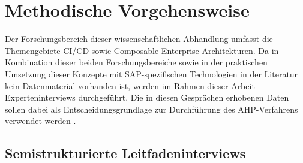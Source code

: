 \section{Methodische Vorgehensweise}

Der Forschungsbereich dieser wissenschaftlichen Abhandlung umfasst die Themengebiete CI/CD sowie Composable-Enterprise-Architekturen. Da in Kombination dieser beiden Forschungsbereiche sowie in der praktischen Umsetzung dieser Konzepte mit SAP-spezifischen Technologien in der Literatur kein Datenmaterial vorhanden ist, werden im Rahmen dieser Arbeit Experteninterviews durchgeführt. Die in diesen Gesprächen erhobenen Daten sollen dabei als Entscheidungsgrundlage zur Durchführung des AHP-Verfahrens verwendet werden \cite[244 ff.]{Hildebrandt.2015}.
\subsection{Semistrukturierte Leitfadeninterviews}
